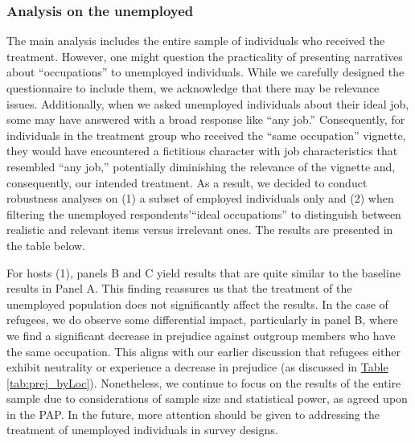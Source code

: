 \documentclass[a4paper,12pt]{article}
\begin{document}
\begin{appendix}
\vspace{5mm}

\subsubsection{Analysis on the unemployed} \label{annex: unemp analysis}

\onehalfspacing

The main analysis includes the entire sample of individuals who received the treatment. However, one might question the practicality of presenting narratives about ``occupations'' to unemployed individuals. While we carefully designed the questionnaire to include them, we acknowledge that there may be relevance issues. Additionally, when we asked unemployed individuals about their ideal job, some may have answered with a broad response like ``any job.'' Consequently, for individuals in the treatment group who received the ``same occupation'' vignette, they would have encountered a fictitious character with job characteristics that resembled ``any job,'' potentially diminishing the relevance of the vignette and, consequently, our intended treatment. As a result, we decided to conduct robustness analyses on (1) a subset of employed individuals only and (2) when filtering the unemployed respondents'``ideal occupations'' to distinguish between realistic and relevant items versus irrelevant ones. The results are presented in the table below.

For hosts (1), panels B and C yield results that are quite similar to the baseline results in Panel A. This finding reassures us that the treatment of the unemployed population does not significantly affect the results. In the case of refugees, we do observe some differential impact, particularly in panel B, where we find a significant decrease in prejudice against outgroup members who have the same occupation. This aligns with our earlier discussion that refugees either exhibit neutrality or experience a decrease in prejudice (as discussed in \hyperref[tab:prej_byLoc]{Table} \ref{tab:prej_byLoc}). Nonetheless, we continue to focus on the results of the entire sample due to considerations of sample size and statistical power, as agreed upon in the PAP. In the future, more attention should be given to addressing the treatment of unemployed individuals in survey designs. \\


\end{appendix}
\end{document}
